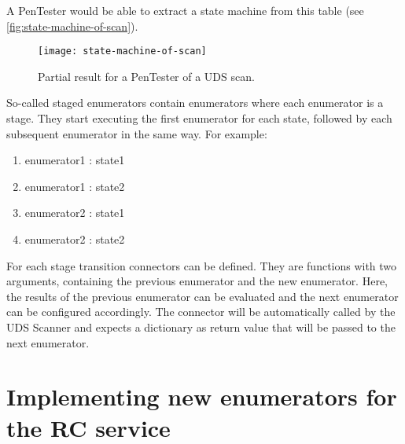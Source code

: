 A PenTester would be able to extract a state machine from this table (see \autoref{fig:state-machine-of-scan}).

\begin{figure}[H]
    \centering
    \texttt{[image: state-machine-of-scan]}
    \caption{Partial result for a PenTester of a UDS scan.}
    \label{fig:state-machine-of-scan}
\end{figure}

So-called staged enumerators contain enumerators where each enumerator is a stage. 
They start executing the first enumerator for each state, followed by each subsequent enumerator in the same way. For example:
\begin{enumerate}
    \item enumerator1 : state1
    \item enumerator1 : state2
    \item enumerator2 : state1
    \item enumerator2 : state2
\end{enumerate}

For each stage transition connectors can be defined. 
They are functions with two arguments, containing the previous enumerator and the new enumerator. 
Here, the results of the previous enumerator can be evaluated and the next enumerator can be configured accordingly. 
The connector will be automatically called by the UDS Scanner and expects a dictionary as return value that will be passed to the next enumerator. 


\section{Implementing new enumerators for the RC service}

